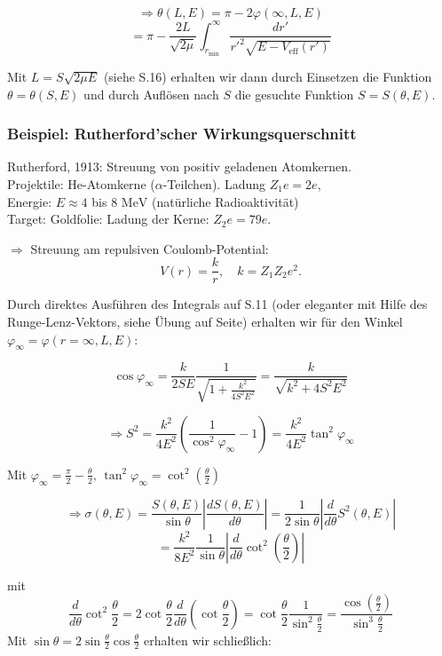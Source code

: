 \documentclass[10pt, letterpaper]{article}
\begin{document}
\[ \Rightarrow \theta(L,E) = \pi - 2\varphi(\infty,L,E) \]
\[ = \pi - \frac{2L}{\sqrt{2\mu}} \int_{r_{\text{min}}}^\infty \frac{dr'}{r'^2\sqrt{E-V_{\text{eff}}(r')}} \]

Mit $L = S\sqrt{2\mu E}$ (siehe S.16) erhalten wir dann durch Einsetzen die Funktion $\theta = \theta(S,E)$ und durch Auflösen nach $S$ die gesuchte Funktion $S=S(\theta,E)$.


\subsubsection{Beispiel: Rutherford'scher Wirkungsquerschnitt}

Rutherford, 1913: Streuung von positiv geladenen Atomkernen.\\
Projektile: He-Atomkerne ($\alpha$-Teilchen). Ladung $Z_1e=2e$,\\
Energie: $E \approx 4$ bis $8\text{ MeV}$ (natürliche Radioaktivität)\\
Target: Goldfolie: Ladung der Kerne: $Z_2e=79e$.

$\Rightarrow$ Streuung am repulsiven Coulomb-Potential:
\[ V(r) = \frac{k}{r}, \quad k = Z_1Z_2e^2. \]

Durch direktes Ausführen des Integrals auf S.11 (oder eleganter mit Hilfe des Runge-Lenz-Vektors, siehe Übung auf Seite) erhalten wir für den Winkel $\varphi_\infty = \varphi(r=\infty,L,E)$:

\[ \cos\varphi_\infty = \frac{k}{2SE}\frac{1}{\sqrt{1+\frac{k^2}{4S^2E^2}}} = \frac{k}{\sqrt{k^2+4S^2E^2}} \]

\[ \Rightarrow S^2 = \frac{k^2}{4E^2}\left(\frac{1}{\cos^2\varphi_\infty}-1\right) = \frac{k^2}{4E^2}\tan^2\varphi_\infty \]

Mit $\varphi_\infty = \frac{\pi}{2} - \frac{\theta}{2}$, $\tan^2\varphi_\infty = \cot^2(\frac{\theta}{2})$

\[ \Rightarrow \sigma(\theta,E) = \frac{S(\theta,E)}{\sin\theta}\left|\frac{dS(\theta,E)}{d\theta}\right| = \frac{1}{2\sin\theta}\left|\frac{d}{d\theta}S^2(\theta,E)\right| \]
\[ = \frac{k^2}{8E^2}\frac{1}{\sin\theta}\left|\frac{d}{d\theta}\cot^2(\frac{\theta}{2})\right| \]

mit 
$$\frac{d}{d\theta}\cot^2\frac{\theta}{2} = 2\cot\frac{\theta}{2}\frac{d}{d\theta}(\cot\frac{\theta}{2}) = \cot\frac{\theta}{2}\frac{1}{\sin^2\frac{\theta}{2}} = \frac{\cos(\frac{\theta}{2})}{\sin^3\frac{\theta}{2}}$$
Mit $\sin\theta = 2\sin\frac{\theta}{2}\cos\frac{\theta}{2}$ erhalten wir schließlich:
\end{document}
